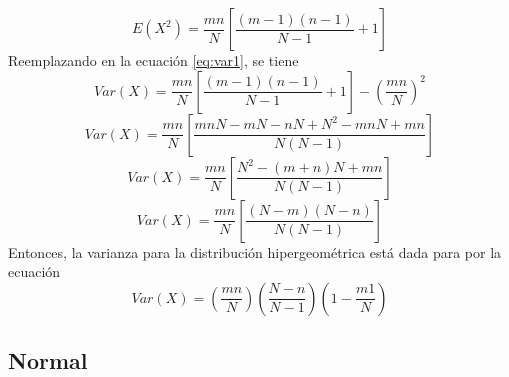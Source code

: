 \documentclass[12pt]{article}
\begin{document}
                \begin{equation*}
                	E(X^2)=\frac{mn}{N}\left[\frac{(m-1)(n-1)}{N-1}+1\right]
                \end{equation*}
                Reemplazando en la ecuación \ref{eq:var1}, se tiene
                \begin{equation*}
                	Var(X)=\frac{mn}{N}\left[\frac{(m-1)(n-1)}{N-1}+1\right]-\left( \frac{mn}{N}\right)^2
                \end{equation*}
                \begin{equation*}
                	Var(X)=\frac{mn}{N}\left[\frac{mnN-mN-nN+N^2-mnN+mn}{N(N-1)}\right]
                \end{equation*}
                \begin{equation*}
                	Var(X)=\frac{mn}{N}\left[\frac{N^2-(m+n)N+mn}{N(N-1)}\right]
                \end{equation*}
                \begin{equation*}
                	Var(X)=\frac{mn}{N}\left[\frac{(N-m)(N-n)}{N(N-1)}\right]
                \end{equation*}
                \newpage Entonces, la varianza para la distribución hipergeométrica está dada para por la ecuación
                \begin{equation}
                	Var(X)=\left( \frac{mn}{N}\right)\left( \frac{N-n}{N-1}\right)\left( 1-\frac{m1}{N}\right)
                \end{equation}
      	\subsection{Normal}
\end{document}
